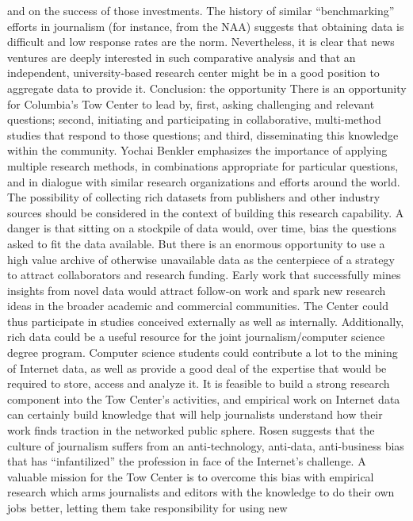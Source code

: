 and on the success of those investments. The history of similar
``benchmarking'' efforts in journalism (for instance, from the NAA)
suggests that obtaining data is difficult and low response rates are the
norm. Nevertheless, it is clear that news ventures are deeply interested in
such comparative analysis and that an independent, university‐based
research center might be in a good position to aggregate data to provide it.
Conclusion: the opportunity
There is an opportunity for Columbia’s Tow Center to lead by, first,
asking challenging and relevant questions; second, initiating and
participating in collaborative, multi‐method studies that respond to those
questions; and third, disseminating this knowledge within the
community. Yochai Benkler emphasizes the importance of applying
multiple research methods, in combinations appropriate for particular
questions, and in dialogue with similar research organizations and efforts
around the world.
The possibility of collecting rich datasets from publishers and other
industry sources should be considered in the context of building this
research capability. A danger is that sitting on a stockpile of data would,
over time, bias the questions asked to fit the data available. But there is an
enormous opportunity to use a high value archive of otherwise
unavailable data as the centerpiece of a strategy to attract collaborators
and research funding. Early work that successfully mines insights from
novel data would attract follow‐on work and spark new research ideas in
the broader academic and commercial communities. The Center could
thus participate in studies conceived externally as well as internally.
Additionally, rich data could be a useful resource for the joint
journalism/computer science degree program. Computer science students
could contribute a lot to the mining of Internet data, as well as provide a
good deal of the expertise that would be required to store, access and
analyze it.
It is feasible to build a strong research component into the Tow Center’s
activities, and empirical work on Internet data can certainly build
knowledge that will help journalists understand how their work finds
traction in the networked public sphere. Rosen suggests that the culture of
journalism suffers from an anti‐technology, anti‐data, anti‐business bias
that has ``infantilized'' the profession in face of the Internet’s challenge. A
valuable mission for the Tow Center is to overcome this bias with
empirical research which arms journalists and editors with the knowledge
to do their own jobs better, letting them take responsibility for using new
